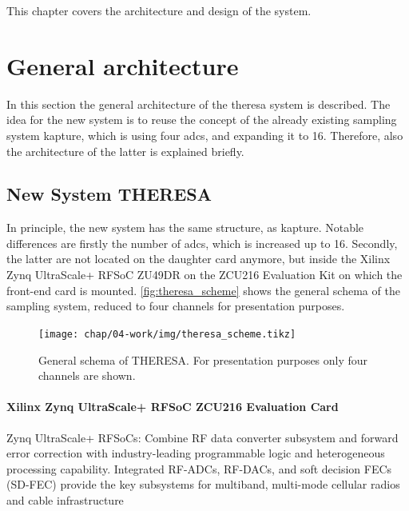 This chapter covers the architecture and design of the system.
\section{General architecture}
In this section the general architecture of the \gls{theresa} system is described.
The idea for the new system is to reuse the concept of the already existing sampling system \gls{kapture}, which is using four \glspl{adc}, and expanding it to 16. Therefore, also the architecture of the latter is explained briefly.

\newpage
\subsection{New System THERESA}
In principle, the new system has the same structure, as \gls{kapture}. Notable differences are firstly the number of \glspl{adc}, which is increased up to 16. Secondly, the latter are not located on the daughter card anymore, but inside the Xilinx Zynq UltraScale+ RFSoC ZU49DR on the ZCU216 Evaluation Kit on which the front-end card is mounted.
\autoref{fig:theresa_scheme} shows the general schema of the sampling system, reduced to four channels for presentation purposes.
\begin{figure}[H]
	\centering
	\texttt{[image: chap/04-work/img/theresa\_scheme.tikz]}
	\caption{General schema of THERESA. For presentation purposes only four channels are shown.}
	\label{fig:theresa_scheme}
\end{figure}

\paragraph{Xilinx Zynq UltraScale+ RFSoC ZCU216 Evaluation Card}

Zynq UltraScale+ RFSoCs: Combine RF data converter subsystem and forward error correction with industry-leading
programmable logic and heterogeneous processing capability. Integrated RF-ADCs, RF-DACs, and soft decision FECs (SD-FEC)
provide the key subsystems for multiband, multi-mode cellular radios and cable infrastructure



